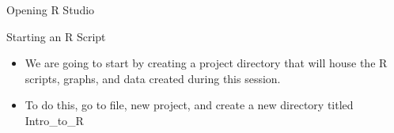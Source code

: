 \documentclass{beamer}
\begin{document}
\begin{frame}{Opening R Studio}
\end{frame}

\begin{frame}{Starting an R Script}
\begin{itemize}
    \item We are going to start by creating a project directory that will house the R scripts, graphs, and data created during this session.
    \item To do this, go to file, new project, and create a new directory titled Intro_to_R
\end{itemize}
\end{frame}
\end{document}

